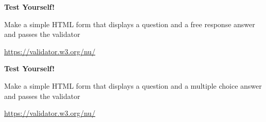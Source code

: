 \bgroup
{}
\begin{frame}[plain]{}
\begin{center}
\textbf{{\Large Test Yourself!}}

\vspace{2em}

Make a simple HTML form that displays a question and a free response answer and passes the validator

\vspace{2em}

\url{https://validator.w3.org/nu/}
\end{center}
\end{frame}
\egroup



\bgroup
{}
\begin{frame}[plain]{}
\begin{center}
\textbf{{\Large Test Yourself!}}

\vspace{2em}

Make a simple HTML form that displays a question and a multiple choice answer and passes the validator

\vspace{2em}

\url{https://validator.w3.org/nu/}
\end{center}
\end{frame}
\egroup







